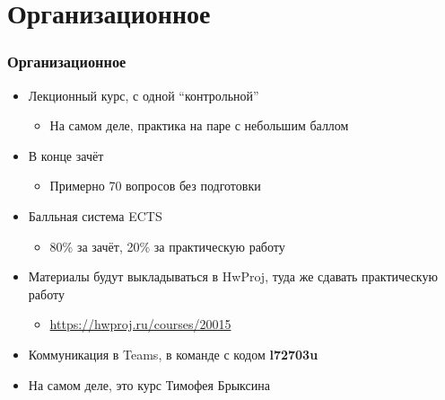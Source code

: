 \documentclass{../../slides-style}
\begin{document}
    \begin{frame}[plain]
        \titlepage
    \end{frame}

    \section{Организационное}

    \begin{frame}
        \frametitle{Организационное}
        \begin{itemize}
            \item Лекционный курс, с одной \enquote{контрольной}
            \begin{itemize}
                \item На самом деле, практика на паре с небольшим баллом
            \end{itemize}
            \item В конце зачёт
            \begin{itemize}
                \item Примерно 70 вопросов без подготовки
            \end{itemize}
            \item Балльная система ECTS
            \begin{itemize}
                \item 80\% за зачёт, 20\% за практическую работу
            \end{itemize}
            \item Материалы будут выкладываться в HwProj, туда же сдавать практическую работу
            \begin{itemize}
                \item \url{https://hwproj.ru/courses/20015}
            \end{itemize}
            \item Коммуникация в Teams, в команде с кодом \textbf{l72703u}
            \item На самом деле, это курс Тимофея Брыксина
        \end{itemize}
    \end{frame}
\end{document}
